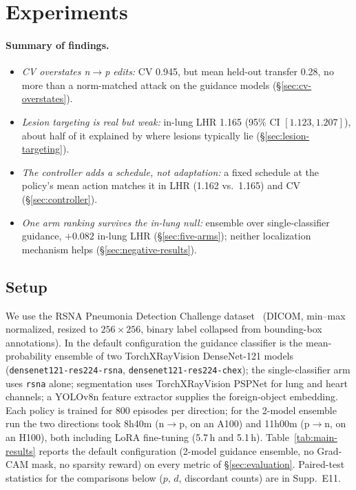 \section{Experiments}
\label{sec:experiments}

\paragraph{Summary of findings.}
\begin{itemize}\setlength{\itemsep}{0pt}\setlength{\parskip}{0pt}
    \item \emph{CV overstates n$\to$p edits:} CV 0.945, but mean held-out transfer 0.28, no more than a norm-matched attack on the guidance models (\S\ref{sec:cv-overstates}).
    \item \emph{Lesion targeting is real but weak:} in-lung LHR 1.165 (95\% CI $[1.123, 1.207]$), about half of it explained by where lesions typically lie (\S\ref{sec:lesion-targeting}).
    \item \emph{The controller adds a schedule, not adaptation:} a fixed schedule at the policy's mean action matches it in LHR (1.162 vs.\ 1.165) and CV (\S\ref{sec:controller}).
    \item \emph{One arm ranking survives the in-lung null:} ensemble over single-classifier guidance, $+0.082$ in-lung LHR (\S\ref{sec:five-arms}); neither localization mechanism helps (\S\ref{sec:negative-results}).
\end{itemize}

\subsection{Setup}
\label{sec:setup}

We use the RSNA Pneumonia Detection Challenge dataset~\cite{rsna2018} (DICOM, min--max normalized, resized to $256\times256$, binary label collapsed from bounding-box annotations). In the default configuration the guidance classifier is the mean-probability ensemble of two TorchXRayVision DenseNet-121 models (\texttt{densenet121-res224-rsna}, \texttt{densenet121-res224-chex}); the single-classifier arm uses \texttt{rsna} alone; segmentation uses TorchXRayVision PSPNet for lung and heart channels; a YOLOv8n feature extractor supplies the foreign-object embedding. Each policy is trained for 800 episodes per direction; for the 2-model ensemble run the two directions took 8h40m (n$\to$p, on an A100) and 11h00m (p$\to$n, on an H100), both including LoRA fine-tuning (5.7\,h and 5.1\,h).
Table~\ref{tab:main-results} reports the default configuration (2-model guidance ensemble, no Grad-CAM mask, no sparsity reward) on every metric of \S\ref{sec:evaluation}. Paired-test statistics for the comparisons below ($p$, $d$, discordant counts) are in Supp.~E11.

